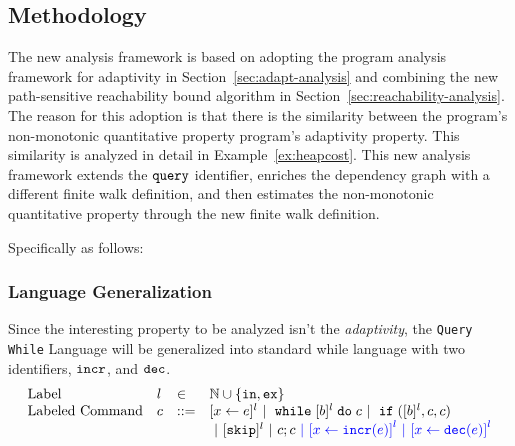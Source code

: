 \subsection{Methodology}
\label{sec:nonmonotonic-methodology}
The new analysis framework is based on adopting the program analysis framework for adaptivity in Section~\ref{sec:adapt-analysis} and combining the new path-sensitive reachability bound algorithm in Section~\ref{sec:reachability-analysis}.
The reason for this adoption is that there is 
the similarity between the program's non-monotonic quantitative property
program's adaptivity property. This similarity is analyzed in detail in Example~\ref{ex:heapcost}.
This new analysis framework extends the ${\tt query}$ identifier,
enriches the dependency graph with a different finite walk definition, and then estimates
the non-monotonic quantitative property through the new finite walk definition.

Specifically as follows:
\subsubsection{Language Generalization} Since the interesting property 
to be analyzed isn't the \emph{adaptivity},
the {\tt Query While} Language will be generalized into standard while language with two identifiers, $\mathtt{incr}$, and $\mathtt{dec}$.
\[
\begin{array}{llll}
\mbox{Label} 
& l & \in & \mathbb{N} \cup \{\lin, \lex\} \\
\mbox{Labeled Command} 
& {c} & ::= & [\assign {{x}}{ {\expr}}]^{l} 
~|~ {\ewhile [ \bexpr ]^{l} \edo {c} }
~|~ \eif([\bexpr]{}^l , {c}, {c})
 \\
 &&&
 ~|~ [\eskip]^l ~|~ {c};{c} 
\highlight{~|~ \clabel{\assign {{x} }{{\alloc(\expr)}}}^{l} ~|~ \clabel{\assign {{x} }{{\release(\expr)}}}^{l}}
\end{array}
\]
